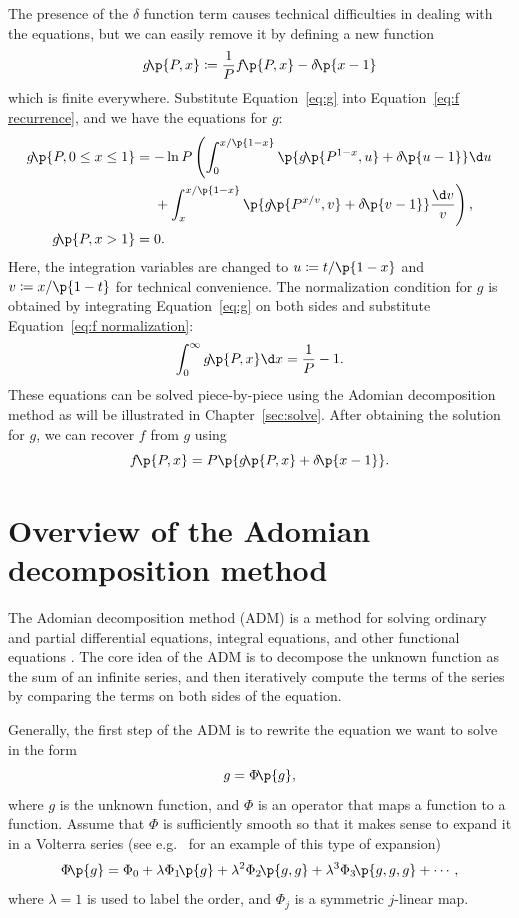 \documentclass[oneside,12pt,final]{ucthesis-CA2012}
\newcommand{\dlt}{\delta}
\newcommand{\lmd}{\lambda}
\newcommand{\ceq}{\coloneqq}
\newcommand{\fr}{\frac}
\newcommand{\fc}[2]{#1\mathchoice{\!}{\!}{}{}\p{#2}} %
\begin{document}
\begin{mainmatter}
The presence of the $\dlt$ function term causes technical difficulties in dealing with the equations,
but we can easily remove it by defining a new function
\begin{equation}
	\label{eq:g}
	\fc g{P,x}\ceq\fr1P\fc f{P,x}-\fc\dlt{x-1}
\end{equation}
which is finite everywhere.
Substitute Equation~\ref{eq:g} into Equation~\ref{eq:f recurrence}, and we have the equations for $g$:
\begin{equation}
	\label{eq:g recurrence}
	\begin{split}
		\fc g{P,0\le x\le1}&=-\ln P\left(
		\int_0^{x/\p{1-x}}\p{\fc g{P^{1-x},u}+\fc\dlt{u-1}}\d u
		\right.\\
		&\phantom{{}=}\left.{}+\int_x^{x/\p{1-x}}\p{\fc g{P^{x/v},v}+\fc\dlt{v-1}}\fr{\d v}v\right),\\
		\fc g{P,x>1}&=0.
	\end{split}
\end{equation}
Here, the integration variables are changed to $u\ceq t/\p{1-x}$ and $v\ceq x/\p{1-t}$
for technical convenience.
The normalization condition for $g$ is obtained by integrating Equation~\ref{eq:g} on both sides
and substitute Equation~\ref{eq:f normalization}:
\begin{equation}
	\label{eq:g normalization}
	\int_0^\infty\fc g{P,x}\d x=\fr1P-1.
\end{equation}
These equations can be solved piece-by-piece using the Adomian decomposition method
as will be illustrated in Chapter~\ref{sec:solve}.
After obtaining the solution for $g$, we can recover $f$ from $g$ using
\[\fc f{P,x}=P\p{\fc g{P,x}+\fc\dlt{x-1}}.\]

\chapter{Overview of the Adomian decomposition method}
\label{sec:adm}

The Adomian decomposition method (ADM) is a method for
solving ordinary and partial differential equations,
integral equations, and other functional equations \cite{Adomian_1994}.
The core idea of the ADM is to decompose the unknown function as the sum of an infinite series,
and then iteratively compute the terms of the series
by comparing the terms on both sides of the equation.

Generally, the first step of the ADM is to rewrite the equation we want to solve in the form
\begin{equation}
	\label{eq:adm first step}
	g=\fc\Phi g,
\end{equation}
where $g$ is the unknown function, and $\Phi$ is an operator that maps a function to a function.
Assume that $\Phi$ is sufficiently smooth so that it makes sense to expand it
in a Volterra series \cite{volterra1930theory}
(see e.g.\ \cite{Ernzerhof_1994} for an example of this type of expansion)
\[\fc\Phi g=\Phi_0+\lmd\fc{\Phi_1}g+\lmd^2\fc{\Phi_2}{g,g}
+\lmd^3\fc{\Phi_3}{g,g,g}+\cdots,\]
where $\lmd=1$ is used to label the order, and
$\Phi_j$ is a symmetric $j$-linear map.


\end{mainmatter}
\end{document}

